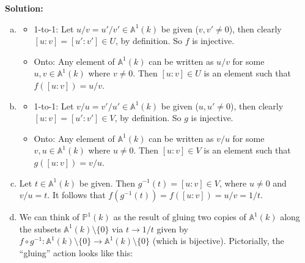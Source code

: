 \documentclass[12pt]{article}
\begin{document}
\noindent \textbf{Solution:} 


\begin{enumerate}[(a)]
	\item 
	\begin{itemize}
		\item 1-to-1: Let $u/v = u'/v' \in \mathbb{A}^1(k)$ be given ($v,v'\neq 0$), then clearly $[u:v] = [u':v'] \in U$, by definition. So $f$ is injective.
		\item Onto: Any element of $\mathbb{A}^1(k)$ can be written as $u/v$ for some $u,v\in \mathbb{A}^1(k)$ where $v\neq 0$. Then $[u:v]\in U$ is an element such that $f([u:v]) = u/v$. 
	\end{itemize}
	\item 
	\begin{itemize}
		\item 1-to-1: Let $v/u = v'/u' \in \mathbb{A}^1(k)$ be given ($u,u'\neq 0$), then clearly $[u:v] = [u':v'] \in V$, by definition. So $g$ is injective.
		\item Onto: Any element of $\mathbb{A}^1(k)$ can be written as $v/u$ for some $v,u\in \mathbb{A}^1(k)$ where $u\neq 0$. Then $[u:v]\in V$ is an element such that $g([u:v]) = v/u$. 
	\end{itemize} 
	\item Let $t\in \mathbb{A}^1(k)$ be given. Then $g^{-1}(t) = [u:v] \in V$, where $u\neq 0$ and $v/u = t$. It follows that $f(g^{-1}(t)) = f([u:v]) = u/v = 1/t$.
	\item We can think of $\mathbb{P}^1(k)$ as the result of gluing two copies of $\mathbb{A}^1(k)$ along the subsets $\mathbb{A}^1(k)\setminus \{0\}$ via $t\to 1/t$ given by $f\circ g^{-1}: \mathbb{A}^1(k)\setminus\{0\} \to \mathbb{A}^1(k)\setminus\{0\}$ (which is bijective). Pictorially, the ``gluing'' action looks like this:
	

\end{enumerate}
\end{document}
